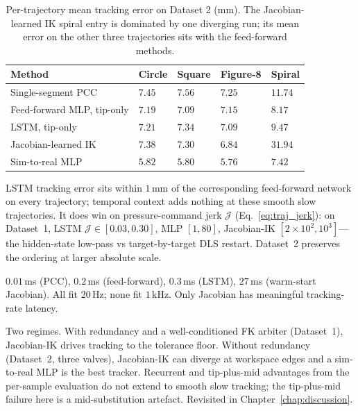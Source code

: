 \begin{table}[ht]
\centering
\caption[Per-trajectory tracking error on Dataset 2.]{Per-trajectory mean tracking error on Dataset 2 (mm). The Jacobian-learned IK spiral entry is dominated by one diverging run; its mean error on the other three trajectories sits with the feed-forward methods.}
\label{tab:res_traj_ds2_per_traj}
\begin{tabularx}{\linewidth}{@{}l X X X X@{}}
\toprule
Method                                        & Circle          & Square          & Figure-8         & Spiral             \\
\midrule
Single-segment PCC                             & $7.45$           & $7.56$           & $7.25$            & $11.74$             \\
Feed-forward MLP, tip-only                     & $7.19$           & $7.09$           & $7.15$            & $8.17$              \\
LSTM, tip-only                                 & $7.21$           & $7.34$           & $7.09$            & $9.47$              \\
Jacobian-learned IK                            & $7.38$           & $7.30$           & $6.84$            & $\mathbf{31.94}$    \\
Sim-to-real MLP                                & $\mathbf{5.82}$  & $\mathbf{5.80}$  & $\mathbf{5.76}$   & $\mathbf{7.42}$     \\
\bottomrule
\end{tabularx}
\end{table}

LSTM tracking error sits within $1$\,mm of the corresponding feed-forward network on every trajectory; temporal context adds nothing at these smooth slow trajectories. It does win on pressure-command jerk $\mathcal{J}$ (Eq.~\ref{eq:traj_jerk}): on Dataset~1, LSTM $\mathcal{J} \in [0.03, 0.30]$, MLP $[1, 80]$, Jacobian-IK $[2 \times 10^{2}, 10^{3}]$---the hidden-state low-pass vs target-by-target DLS restart. Dataset~2 preserves the ordering at larger absolute scale.

$0.01$\,ms (PCC), $0.2$\,ms (feed-forward), $0.3$\,ms (LSTM), $27$\,ms (warm-start Jacobian). All fit $20$\,Hz; none fit $1$\,kHz. Only Jacobian has meaningful tracking-rate latency.

Two regimes. With redundancy and a well-conditioned FK arbiter (Dataset~1), Jacobian-IK drives tracking to the tolerance floor. Without redundancy (Dataset~2, three valves), Jacobian-IK can diverge at workspace edges and a sim-to-real MLP is the best tracker. Recurrent and tip-plus-mid advantages from the per-sample evaluation do not extend to smooth slow tracking; the tip-plus-mid failure here is a mid-substitution artefact. Revisited in Chapter~\ref{chap:discussion}.

